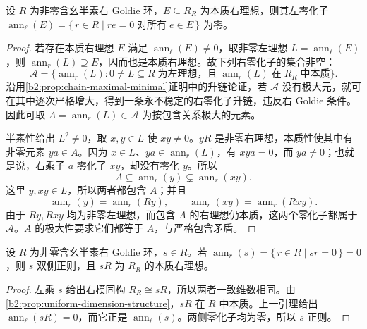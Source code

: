 \begin{lemma}\label{b2:lem:essential-annihilator-zero}
	设 \(R\) 为非零含幺半素右 Goldie 环，\(E\subseteq R_R\) 为本质右理想，则其左零化子 \(\operatorname{ann}_{\ell}(E)=\{\,r\in R\mid re=0\;\text{对所有}\;e\in E\,\}\) 为零。
\end{lemma}
\begin{proof}
	若存在本质右理想 \(E\) 满足 \(\operatorname{ann}_{\ell}(E)\ne0\)，取非零左理想 \(L=\operatorname{ann}_{\ell}(E)\)，则 \(\operatorname{ann}_r(L)\supseteq E\)，因而也是本质右理想。故下列右零化子的集合非空：
	\[
		\mathcal A= \bigl\{\operatorname{ann}_r(L): 0\ne L\subseteq R\;\text{为左理想，且}\;\operatorname{ann}_r(L)\;\text{在}\;R_R\;\text{中本质}\bigr\}.
	\]
	沿用\cref{b2:prop:chain-maximal-minimal}证明中的升链论证，若 \(\mathcal A\) 没有极大元，就可在其中逐次严格增大，得到一条永不稳定的右零化子升链，违反右 Goldie 条件。因此可取 \(A=\operatorname{ann}_r(L)\in\mathcal A\) 为按包含关系极大的元素。

	半素性给出 \(L^2\ne0\)，取 \(x,y\in L\) 使 \(xy\ne0\)。\(yR\) 是非零右理想，本质性使其中有非零元素 \(ya\in A\)。因为 \(x\in L\)、\(ya\in\operatorname{ann}_r(L)\)，有 \(xya=0\)，而 \(ya\ne0\)；也就是说，右乘子 \(a\) 零化了 \(xy\)，却没有零化 \(y\)。所以
	\[
		A\subseteq\operatorname{ann}_r(y)\subsetneq\operatorname{ann}_r(xy).
	\]
	这里 \(y,xy\in L\)，所以两者都包含 \(A\)；并且
	\[
		\operatorname{ann}_r(y)=\operatorname{ann}_r(Ry),\qquad \operatorname{ann}_r(xy)=\operatorname{ann}_r(Rxy).
	\]
	由于 \(Ry,Rxy\) 均为非零左理想，而包含 \(A\) 的右理想仍本质，这两个零化子都属于 \(\mathcal A\)。\(A\) 的极大性要求它们都等于 \(A\)，与严格包含矛盾。
\end{proof}

\begin{lemma}\label{b2:lem:one-sided-regular-goldie}
	设 \(R\) 为非零含幺半素右 Goldie 环，\(s\in R\)。若 \(\operatorname{ann}_r(s)=\{\,r\in R\mid sr=0\,\}=0\)，则 \(s\) 双侧正则，且 \(sR\) 为 \(R_R\) 的本质右理想。
\end{lemma}
\begin{proof}
	左乘 \(s\) 给出右模同构 \(R_R\cong sR\)，所以两者一致维数相同。由\cref{b2:prop:uniform-dimension-structure}，\(sR\) 在 \(R\) 中本质。上一引理给出 \(\operatorname{ann}_{\ell}(sR)=0\)，而它正是 \(\operatorname{ann}_{\ell}(s)\)。两侧零化子均为零，所以 \(s\) 正则。
\end{proof}

